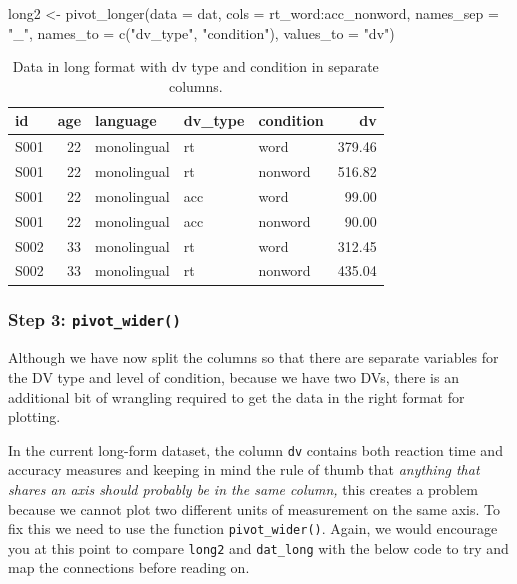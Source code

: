 \documentclass[
  english,
  doc,floatsintext]{apa6}
\newenvironment{Shaded}{\begin{snugshade}}{\end{snugshade}}
\newcommand{\AttributeTok}[1]{\textcolor[rgb]{0.77,0.63,0.00}{#1}}
\newcommand{\FunctionTok}[1]{\textcolor[rgb]{0.00,0.00,0.00}{#1}}
\newcommand{\NormalTok}[1]{#1}
\newcommand{\OtherTok}[1]{\textcolor[rgb]{0.56,0.35,0.01}{#1}}
\newcommand{\SpecialCharTok}[1]{\textcolor[rgb]{0.00,0.00,0.00}{#1}}
\newcommand{\StringTok}[1]{\textcolor[rgb]{0.31,0.60,0.02}{#1}}
\begin{document}
\begin{Shaded}
\begin{Highlighting}[]
\NormalTok{long2 }\OtherTok{\textless{}{-}} \FunctionTok{pivot\_longer}\NormalTok{(}\AttributeTok{data =}\NormalTok{ dat, }
                     \AttributeTok{cols =}\NormalTok{ rt\_word}\SpecialCharTok{:}\NormalTok{acc\_nonword, }
                     \AttributeTok{names\_sep =} \StringTok{"\_"}\NormalTok{, }
                     \AttributeTok{names\_to =} \FunctionTok{c}\NormalTok{(}\StringTok{"dv\_type"}\NormalTok{, }\StringTok{"condition"}\NormalTok{),}
                     \AttributeTok{values\_to =} \StringTok{"dv"}\NormalTok{)}
\end{Highlighting}
\end{Shaded}

\begin{table}

\caption{\label{tab:long-example}Data in long format with dv type and condition in separate columns.}
\centering
\begin{tabular}[t]{l|r|l|l|l|r}
\hline
id & age & language & dv\_type & condition & dv\\
\hline
S001 & 22 & monolingual & rt & word & 379.46\\
\hline
S001 & 22 & monolingual & rt & nonword & 516.82\\
\hline
S001 & 22 & monolingual & acc & word & 99.00\\
\hline
S001 & 22 & monolingual & acc & nonword & 90.00\\
\hline
S002 & 33 & monolingual & rt & word & 312.45\\
\hline
S002 & 33 & monolingual & rt & nonword & 435.04\\
\hline
\end{tabular}
\end{table}

\hypertarget{step-3-pivot_wider}{%
\subsubsection{\texorpdfstring{Step 3: \texttt{pivot\_wider()}}{Step 3: pivot\_wider()}}\label{step-3-pivot_wider}}

Although we have now split the columns so that there are separate variables for the DV type and level of condition, because we have two DVs, there is an additional bit of wrangling required to get the data in the right format for plotting.

In the current long-form dataset, the column \texttt{dv} contains both reaction time and accuracy measures and keeping in mind the rule of thumb that \emph{anything that shares an axis should probably be in the same column,} this creates a problem because we cannot plot two different units of measurement on the same axis. To fix this we need to use the function \texttt{pivot\_wider()}. Again, we would encourage you at this point to compare \texttt{long2} and \texttt{dat\_long} with the below code to try and map the connections before reading on.
\end{document}
